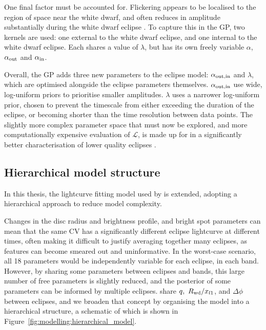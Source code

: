 One final factor must be accounted for. Flickering appears to be localised to the region of space near the white dwarf, and often reduces in amplitude substantially during the white dwarf eclipse \citep{McAllister2017}.
To capture this in the GP, two kernels are used: one external to the white dwarf eclipse, and one internal to the white dwarf eclipse. Each shares a value of $\lambda$, but has its own freely variable $\alpha$, $\alpha_{\rm out}$ and $\alpha_{\rm in}$.

Overall, the GP adds three new parameters to the eclipse model: $\alpha_{\rm out, in}$ and $\lambda$, which are optimised alongside the eclipse parameters themselves. $\alpha_{\rm out, in}$ use wide, log-uniform priors to prioritise smaller amplitudes. $\lambda$ uses a narrower log-uniform prior, chosen to prevent the timescale from either exceeding the duration of the eclipse, or becoming shorter than the time resolution between data points.
The slightly more complex parameter space that must now be explored, and more computationally expensive evaluation of $\mathcal{L}$, is made up for in a significantly better characterisation of lower quality eclipses \citep{McAllister2017}.



\subsection{Hierarchical model structure}
\label{sect:modelling:optimising eclipse model parameters}

In this thesis, the lightcurve fitting model used by \citet{McAllister2019} is extended, adopting a hierarchical approach to reduce model complexity.

Changes in the disc radius and brightness profile, and bright spot parameters can mean that the same CV has a significantly different eclipse lightcurve at different times, often making it difficult to justify averaging together many eclipses, as features can become smeared out and uninformative. In the worst-case scenario, all 18 parameters would be independently variable for each eclipse, in each band. However, by sharing some parameters between eclipses and bands, this large number of free parameters is slightly reduced, and the posterior of some parameters can be informed by multiple eclipses. \citet{McAllister2017} share $q,\ R_{\rm wd} / x_{l1}$, and $\Delta\phi$ between eclipses, and we broaden that concept by organising the model into a hierarchical structure, a schematic of which is shown in Figure~\ref{fig:modelling:hierarchical_model}.


